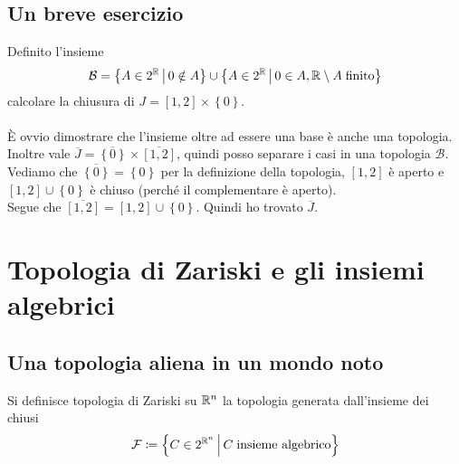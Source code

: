 \subsection{\textcolor{TopGener}{\textbf{Un breve esercizio}}}



\begin{example}
	Definito l'insieme $$\mathcal{B} = \left\{A \in 2^{\mathbb{R}} \,\middle|\, 0 \notin A \right\} \cup \left\{ A \in 2^{\mathbb{R}} \,\middle|\, 0 \in A, \mathbb{R} \setminus A \; \text{finito} \right\}$$ calcolare la chiusura di $J = \left[1,2\right] \times \left\{0\right\}$. \\ \\
	È ovvio dimostrare che l'insieme oltre ad essere una base è anche una topologia. \\ Inoltre vale $\overline{J} = \overline{\left\{0\right\}} \times \overline{\left[1,2\right]}$, quindi posso separare i casi in una topologia $\mathcal{B}$. Vediamo che $\overline{\left\{0\right\}} = \left\{0\right\}$ per la definizione della topologia, $\left[1,2\right]$ è aperto e $\left[1,2\right] \cup \left\{0\right\}$ è chiuso (perché il complementare è aperto). \\ Segue che $\overline{\left[1,2\right]} = \left[1,2\right] \cup \left\{0\right\}$. Quindi ho trovato $\overline{J}$.
\end{example}


\section{Topologia di Zariski e gli insiemi algebrici}
\subsection{\textcolor{TopGener}{\textbf{Una topologia aliena in un mondo noto}}}



\begin{definition}
	Si definisce topologia di Zariski su $\mathbb{R}^n$ la topologia generata dall'insieme dei chiusi 
	\begin{equation*}
	\mathcal{F} \coloneqq \left\{ C \in 2^{\mathbb{R}^n} \,\middle|\, C \; \text{insieme algebrico} \right\}
	\end{equation*}
\end{definition}

